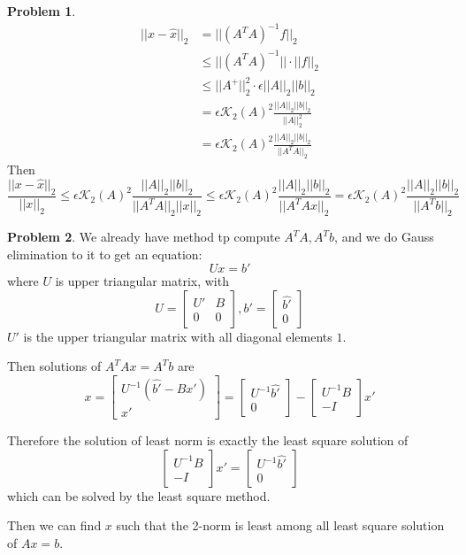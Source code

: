 \documentclass[a4paper]{article}
\theoremstyle{definition}
\newtheorem{problem}{Problem}
\theoremstyle{plain}
\newcommand{\dps}{\displaystyle}
\numberwithin{equation}{problem}
\begin{document}
\begin{problem}
    \begin{align*}
        ||x-\hat{x}||_2&=||(A^TA)^{-1}f||_2\\
        & \leq ||(A^TA)^{-1}||\cdot||f||_2\\
        & \leq ||A^+||_2^2\cdot\epsilon ||A||_2||b||_2\\
        &=\epsilon\mathcal{K}_2(A)^2\dps\frac{||A||_2||b||_2}{||A||_2^2}\\
        &=\epsilon\mathcal{K}_2(A)^2 \frac{||A||_2||b||_2}{||A^TA||_2}
    \end{align*}
    Then\[\dps\frac{||x-\hat{x}||_2}{||x||_2} \leq\epsilon\mathcal{K}_2(A)^2 \frac{||A||_2||b||_2}{||A^TA||_2||x||_2} \leq \epsilon\mathcal{K}_2(A)^2 \frac{||A||_2||b||_2}{||A^TAx||_2}=\epsilon\mathcal{K}_2(A)^2 \frac{||A||_2||b||_2}{||A^Tb||_2}\]
\end{problem}

\begin{problem}
    We already have method tp compute  $ A^TA,A^Tb $, and we do Gauss elimination to it to get an equation:
    \[Ux=b'\]
    where  $ U $ is upper triangular matrix, with 
    \[
        U=\begin{bmatrix}
            U' & B\\
            0 & 0
        \end{bmatrix},
        b'=\begin{bmatrix}
            \hat{b'}\\
            0
        \end{bmatrix}
    \] 
     $ U' $ is the upper triangular matrix with all diagonal elements $ 1 $.
     
     Then solutions of  $ A^TAx=A^Tb $ are
     \[x=\begin{bmatrix}
        U^{-1}(\hat{b'}-Bx')\\
        x'
     \end{bmatrix}=\begin{bmatrix}
        U^{-1}\hat{b'}\\
        0
     \end{bmatrix}-\begin{bmatrix}
        U^{-1}B\\
        -I
     \end{bmatrix}x'
     \]
     
     Therefore the solution of least norm is exactly the least square solution of 
     \[
        \begin{bmatrix}
            U^{-1}B\\
            -I
         \end{bmatrix}x'=\begin{bmatrix}
            U^{-1}\hat{b'}\\
            0
         \end{bmatrix}
     \] 
     which can be solved by the least square method.

     Then we can find  $ x $ such that the 2-norm is least among all least square solution of  $ Ax=b $. 
\end{problem}
\end{document}
